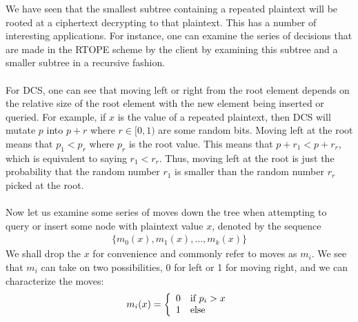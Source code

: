 \documentclass[12pt]{article}
\begin{document}
We have seen that the smallest subtree containing a repeated plaintext will be rooted at a ciphertext decrypting to that plaintext. This has a number of interesting applications. For instance, one can examine the series of decisions that are made in the RTOPE scheme by the client by examining this subtree and a smaller subtree in a recursive fashion. \\ \\
For DCS, one can see that moving left or right from the root element depends on the relative size of the root element with the new element being inserted or queried. For example, if $x$ is the value of a repeated plaintext, then DCS will mutate $p$ into $p + r$ where $r \in [0,1)$ are some random bits. Moving left at the root means that $p_1 < p_r$ where $p_r$ is the root value. This means that $p + r_1 < p + r_r$, which is equivalent to saying $r_1 < r_r$. Thus, moving left at the root is just the probability that the random number $r_1$ is smaller than the random number $r_r$ picked at the root. \\ \\
Now let us examine some series of moves down the tree when attempting to query or insert some node with plaintext value $x$, denoted by the sequence
  \begin{eqnarray}
    \{ m_0(x), m_1(x), \ldots, m_k(x) \}
  \end{eqnarray}
We shall drop the $x$ for convenience and commonly refer to moves as $m_i$. We see that $m_i$ can take on two possibilities, 0 for left or 1 for moving right, and we can characterize the moves:
  \begin{eqnarray}
    m_i(x) = \left\{ \begin{array}{l l}
        0 & \textrm{if } p_i > x \\
        1 & \textrm{else}
    \end{array} \right.
  \end{eqnarray}
\end{document}
